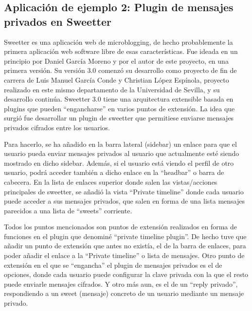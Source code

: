 \subsection{Aplicación de ejemplo 2: Plugin de mensajes privados en Sweetter}

Sweetter es una aplicación web de microblogging, de hecho probablemente la primera aplicación web software libre de esas características. Fue ideada en un principio por Daniel García Moreno y por el autor de este proyecto, en una primera versión. Su versión 3.0 comenzó su desarrollo como proyecto de fin de carrera de Luis Manuel García Conde y Christian López Espínola, proyecto realizado en este mismo departamento de la Universidad de Sevilla, y su desarrollo continúa. Sweetter 3.0 tiene una arquitectura extensible basada en plugins que pueden ``engancharse'' en varios puntos de extensión. La idea que surgió fue desarrollar un plugin de sweetter que permitiese enviarse mensajes privados cifrados entre los usuarios.


Para hacerlo, se ha añadido en la barra lateral (sidebar) un enlace para que el usuario pueda enviar mensajes privados al usuario que actualmente esté siendo mostrado en dicho sidebar. Además, si el usuario está viendo el perfil de otro usuario, podrá acceder también a dicho enlace en la ``headbar'' o barra de cabecera. En la lista de enlaces superior donde salen las vistas/acciones principales de sweetter, se añadió la vista ``Private timeline'' donde cada usuario puede acceder a sus mensajes privados, que salen en forma de una lista mensajes parecidos a una lista de ``sweets'' corriente.


Todos los puntos mencionados son puntos de extensión realizados en forma de funciones en el plugin que denominé ``private timeline plugin''. De hecho tuve que añadir un punto de extensión que antes no existía, el de la barra de enlaces, para poder añadir el enlace a la ``Private timeline'' o lista de mensajes. Otro punto de extensión en el que se ``engancha'' el plugin de mensajes privados es el de opciones, donde cada usuario puede configurar la clave privada con la que el resto puede enviarle mensajes cifrados. Y otro más aun, es el de un ``reply privado'', respondiendo a un sweet (mensaje) concreto de un usuario mediante un mensaje privado.

